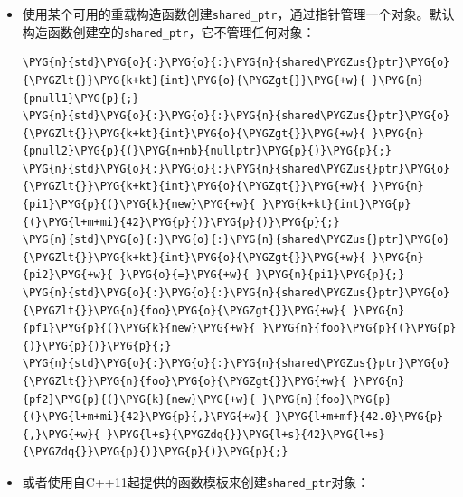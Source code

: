 \begin{itemize}
\item 使用某个可用的重载构造函数创建\texttt{shared\_\allowbreak{}ptr}，通过指针管理一个对象。默认构造函数创建空的\texttt{shared\_\allowbreak{}ptr}，它不管理任何对象：



\begin{codeblockbg}
\begin{Verbatim}[commandchars=\\\{\},breaklines=true,breakanywhere=true,fontsize=\codefont,xleftmargin=17bp]
\PYG{n}{std}\PYG{o}{:}\PYG{o}{:}\PYG{n}{shared\PYGZus{}ptr}\PYG{o}{\PYGZlt{}}\PYG{k+kt}{int}\PYG{o}{\PYGZgt{}}\PYG{+w}{ }\PYG{n}{pnull1}\PYG{p}{;}
\PYG{n}{std}\PYG{o}{:}\PYG{o}{:}\PYG{n}{shared\PYGZus{}ptr}\PYG{o}{\PYGZlt{}}\PYG{k+kt}{int}\PYG{o}{\PYGZgt{}}\PYG{+w}{ }\PYG{n}{pnull2}\PYG{p}{(}\PYG{n+nb}{nullptr}\PYG{p}{)}\PYG{p}{;}
\PYG{n}{std}\PYG{o}{:}\PYG{o}{:}\PYG{n}{shared\PYGZus{}ptr}\PYG{o}{\PYGZlt{}}\PYG{k+kt}{int}\PYG{o}{\PYGZgt{}}\PYG{+w}{ }\PYG{n}{pi1}\PYG{p}{(}\PYG{k}{new}\PYG{+w}{ }\PYG{k+kt}{int}\PYG{p}{(}\PYG{l+m+mi}{42}\PYG{p}{)}\PYG{p}{)}\PYG{p}{;}
\PYG{n}{std}\PYG{o}{:}\PYG{o}{:}\PYG{n}{shared\PYGZus{}ptr}\PYG{o}{\PYGZlt{}}\PYG{k+kt}{int}\PYG{o}{\PYGZgt{}}\PYG{+w}{ }\PYG{n}{pi2}\PYG{+w}{ }\PYG{o}{=}\PYG{+w}{ }\PYG{n}{pi1}\PYG{p}{;}
\PYG{n}{std}\PYG{o}{:}\PYG{o}{:}\PYG{n}{shared\PYGZus{}ptr}\PYG{o}{\PYGZlt{}}\PYG{n}{foo}\PYG{o}{\PYGZgt{}}\PYG{+w}{ }\PYG{n}{pf1}\PYG{p}{(}\PYG{k}{new}\PYG{+w}{ }\PYG{n}{foo}\PYG{p}{(}\PYG{p}{)}\PYG{p}{)}\PYG{p}{;}
\PYG{n}{std}\PYG{o}{:}\PYG{o}{:}\PYG{n}{shared\PYGZus{}ptr}\PYG{o}{\PYGZlt{}}\PYG{n}{foo}\PYG{o}{\PYGZgt{}}\PYG{+w}{ }\PYG{n}{pf2}\PYG{p}{(}\PYG{k}{new}\PYG{+w}{ }\PYG{n}{foo}\PYG{p}{(}\PYG{l+m+mi}{42}\PYG{p}{,}\PYG{+w}{ }\PYG{l+m+mf}{42.0}\PYG{p}{,}\PYG{+w}{ }\PYG{l+s}{\PYGZdq{}}\PYG{l+s}{42}\PYG{l+s}{\PYGZdq{}}\PYG{p}{)}\PYG{p}{)}\PYG{p}{;}
\end{Verbatim}
\end{codeblockbg}



\item 或者使用自C++11起提供的函数模板来创建\texttt{shared\_\allowbreak{}ptr}对象：




\end{itemize}
